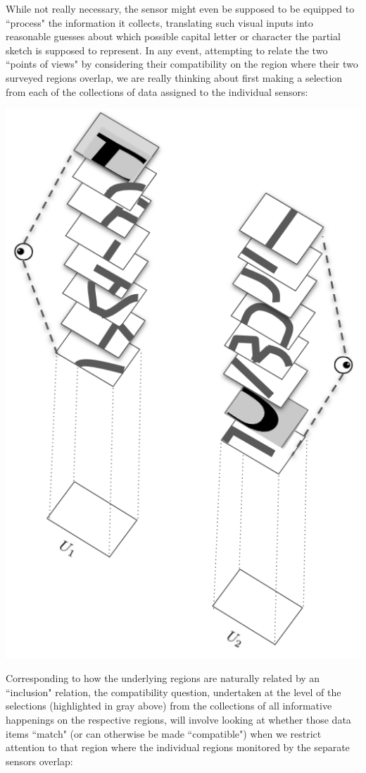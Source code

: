 \documentclass[a4paper]{book}
\theoremstyle{definition}
\theoremstyle{definition}
\theoremstyle{definition}
\theoremstyle{theorem}
\theoremstyle{definition}
\begin{document}
	While not really necessary, the sensor might even be supposed to be equipped to ``process" the information it collects, translating such visual inputs into reasonable guesses about which possible capital letter or character the partial sketch is supposed to represent. In any event, attempting to relate the two ``points of views" by considering their compatibility on the region where their two surveyed regions overlap, we are really thinking about first making a selection from each of the collections of data assigned to the individual sensors:   
	\begin{center}
		\includegraphics[scale=0.25]{EyeballBest2.png}
	\end{center}
Corresponding to how the underlying regions are naturally related by an ``inclusion" relation, the compatibility question, undertaken at the level of the selections (highlighted in gray above) from the collections of all informative happenings on the respective regions, will involve looking at whether those data items ``match" (or can otherwise be made ``compatible") when we restrict attention to that region where the individual regions monitored by the separate sensors overlap:  
\end{document}
